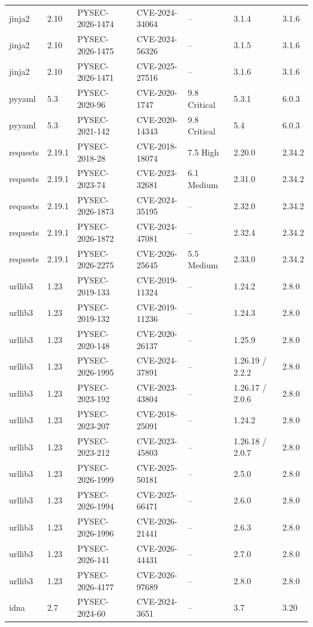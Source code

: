 \documentclass[11pt,a4paper]{article}
\begin{document}
{\begin{longtable}{@{}lllllll@{}}
jinja2 & 2.10 & PYSEC-2026-1474 & CVE-2024-34064 & -- & 3.1.4 & 3.1.6 \\
jinja2 & 2.10 & PYSEC-2026-1475 & CVE-2024-56326 & -- & 3.1.5 & 3.1.6 \\
jinja2 & 2.10 & PYSEC-2026-1471 & CVE-2025-27516 & -- & 3.1.6 & 3.1.6 \\
pyyaml & 5.3 & PYSEC-2020-96 & CVE-2020-1747 & 9.8 Critical & 5.3.1 & 6.0.3 \\
pyyaml & 5.3 & PYSEC-2021-142 & CVE-2020-14343 & 9.8 Critical & 5.4 & 6.0.3 \\
requests & 2.19.1 & PYSEC-2018-28 & CVE-2018-18074 & 7.5 High & 2.20.0 & 2.34.2 \\
requests & 2.19.1 & PYSEC-2023-74 & CVE-2023-32681 & 6.1 Medium & 2.31.0 & 2.34.2 \\
requests & 2.19.1 & PYSEC-2026-1873 & CVE-2024-35195 & -- & 2.32.0 & 2.34.2 \\
requests & 2.19.1 & PYSEC-2026-1872 & CVE-2024-47081 & -- & 2.32.4 & 2.34.2 \\
requests & 2.19.1 & PYSEC-2026-2275 & CVE-2026-25645 & 5.5 Medium & 2.33.0 & 2.34.2 \\
urllib3 & 1.23 & PYSEC-2019-133 & CVE-2019-11324 & -- & 1.24.2 & 2.8.0 \\
urllib3 & 1.23 & PYSEC-2019-132 & CVE-2019-11236 & -- & 1.24.3 & 2.8.0 \\
urllib3 & 1.23 & PYSEC-2020-148 & CVE-2020-26137 & -- & 1.25.9 & 2.8.0 \\
urllib3 & 1.23 & PYSEC-2026-1995 & CVE-2024-37891 & -- & 1.26.19 / 2.2.2 & 2.8.0 \\
urllib3 & 1.23 & PYSEC-2023-192 & CVE-2023-43804 & -- & 1.26.17 / 2.0.6 & 2.8.0 \\
urllib3 & 1.23 & PYSEC-2023-207 & CVE-2018-25091 & -- & 1.24.2 & 2.8.0 \\
urllib3 & 1.23 & PYSEC-2023-212 & CVE-2023-45803 & -- & 1.26.18 / 2.0.7 & 2.8.0 \\
urllib3 & 1.23 & PYSEC-2026-1999 & CVE-2025-50181 & -- & 2.5.0 & 2.8.0 \\
urllib3 & 1.23 & PYSEC-2026-1994 & CVE-2025-66471 & -- & 2.6.0 & 2.8.0 \\
urllib3 & 1.23 & PYSEC-2026-1996 & CVE-2026-21441 & -- & 2.6.3 & 2.8.0 \\
urllib3 & 1.23 & PYSEC-2026-141 & CVE-2026-44431 & -- & 2.7.0 & 2.8.0 \\
urllib3 & 1.23 & PYSEC-2026-4177 & CVE-2026-97689 & -- & 2.8.0 & 2.8.0 \\
idna & 2.7 & PYSEC-2024-60 & CVE-2024-3651 & -- & 3.7 & 3.20 \\

\end{longtable}}
\end{document}
